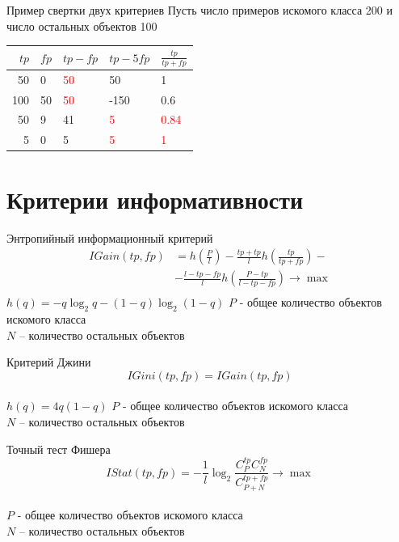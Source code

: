 \documentclass[10pt]{beamer}
\begin{document}
\begin{frame}{Пример свертки двух критериев}
	Пусть число примеров искомого класса 200 и число остальных объектов 100\\
	\bigbreak
	\begin{tabular}{|r l|l|l|l|}
	  \hline 
	  $tp$ & $fp$ & $tp-fp$ & $tp-5fp$ & $\frac{tp}{tp+fp}$\\ 
	  \hline \hline
	  50 & 0 & \textcolor{red}{50} & 50 & 1\\
	  \hline
	  100 & 50 & \textcolor{red}{50} & -150 & 0.6\\
	  \hline \hline
	  50 & 9 & 41 & \textcolor{red}{5} & \textcolor{red}{0.84}\\
	  \hline  
	  5 & 0 & 5 & \textcolor{red}{5} & \textcolor{red}{1}\\  
	  \hline 
	\end{tabular}
\end{frame}

\section{Критерии информативности}

\begin{frame}{Энтропийный информационный критерий}
  \begin{align*} 
		IGain(tp,fp) &= h(\frac{P}{l}) - \frac{tp+tp}{l}h(\frac{tp}{tp+fp}) - \\
		&- \frac{l-tp-fp}{l}h(\frac{P-tp}{l-tp-fp}) \rightarrow \max \\
	\end{align*} 
	$h(q) = -q\log_2q - (1-q)\log_2(1-q)$
	\bigbreak	
	$P$ - общее количество объектов искомого класса\\
	$N$ -- количество остальных объектов
\end{frame}

\begin{frame}{Критерий Джини}
	$$IGini(tp,fp)=IGain(tp,fp) $$\\
	\bigbreak
	$h(q)=4q(1-q)$
	\bigbreak
	$P$ - общее количество объектов искомого класса\\
	$N$ -- количество остальных объектов
\end{frame}

{
\begin{frame}{Точный тест Фишера}
	$$IStat(tp,fp) = -\frac{1}{l}\log_2\frac{C_P^{tp}C_N^{fp}}{C_{P+N}^{tp+fp}} \rightarrow \max$$\\
	\bigbreak
	$P$ - общее количество объектов искомого класса\\
	$N$ -- количество остальных объектов
\end{frame}
}
\end{document}
